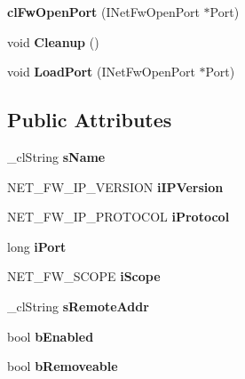 \begin{DoxyCompactItemize}
\item 
\hypertarget{classcl_fw_open_port_a08549ac9d48164bed48d4bb8bbdd32fb}{
{\bfseries clFwOpenPort} (INetFwOpenPort $\ast$Port)}
\label{classcl_fw_open_port_a08549ac9d48164bed48d4bb8bbdd32fb}

\item 
\hypertarget{classcl_fw_open_port_af9004dd3f679c32cc7a8221b2c1a27fb}{
void {\bfseries Cleanup} ()}
\label{classcl_fw_open_port_af9004dd3f679c32cc7a8221b2c1a27fb}

\item 
\hypertarget{classcl_fw_open_port_a9a9126123d9ff4d5bf468d9e125077a9}{
void {\bfseries LoadPort} (INetFwOpenPort $\ast$Port)}
\label{classcl_fw_open_port_a9a9126123d9ff4d5bf468d9e125077a9}

\end{DoxyCompactItemize}
\subsection*{Public Attributes}
\begin{DoxyCompactItemize}
\item 
\hypertarget{classcl_fw_open_port_ad7990b3c821e8e0b873ebca6bddbfbdd}{
\_\-clString {\bfseries sName}}
\label{classcl_fw_open_port_ad7990b3c821e8e0b873ebca6bddbfbdd}

\item 
\hypertarget{classcl_fw_open_port_a972a908bfd9580b9b1909c2ba8905252}{
NET\_\-FW\_\-IP\_\-VERSION {\bfseries iIPVersion}}
\label{classcl_fw_open_port_a972a908bfd9580b9b1909c2ba8905252}

\item 
\hypertarget{classcl_fw_open_port_a140a6e2f56c47f8506cae937384dc87b}{
NET\_\-FW\_\-IP\_\-PROTOCOL {\bfseries iProtocol}}
\label{classcl_fw_open_port_a140a6e2f56c47f8506cae937384dc87b}

\item 
\hypertarget{classcl_fw_open_port_accaea8c282f335e0d956ccac99774dfa}{
long {\bfseries iPort}}
\label{classcl_fw_open_port_accaea8c282f335e0d956ccac99774dfa}

\item 
\hypertarget{classcl_fw_open_port_a09858dafc5425d31e8fa9768c51cf55b}{
NET\_\-FW\_\-SCOPE {\bfseries iScope}}
\label{classcl_fw_open_port_a09858dafc5425d31e8fa9768c51cf55b}

\item 
\hypertarget{classcl_fw_open_port_a53c02080c192d57a798b8d3187da72f7}{
\_\-clString {\bfseries sRemoteAddr}}
\label{classcl_fw_open_port_a53c02080c192d57a798b8d3187da72f7}

\item 
\hypertarget{classcl_fw_open_port_a7bf1f8e22172ae7d3fe05095e8dd8db4}{
bool {\bfseries bEnabled}}
\label{classcl_fw_open_port_a7bf1f8e22172ae7d3fe05095e8dd8db4}

\item 
\hypertarget{classcl_fw_open_port_a137617729730fc72a3f2057ff002963c}{
bool {\bfseries bRemoveable}}
\label{classcl_fw_open_port_a137617729730fc72a3f2057ff002963c}

\end{DoxyCompactItemize}
